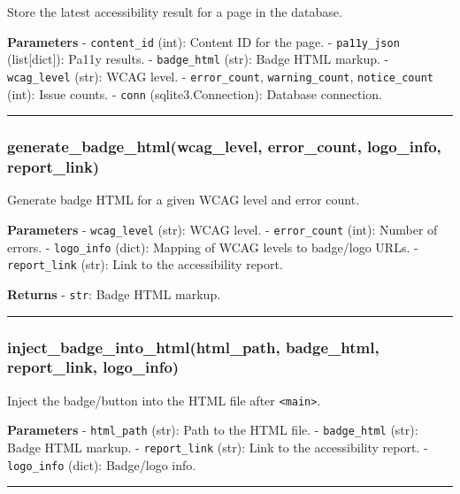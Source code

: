 Store the latest accessibility result for a page in the database.

\textbf{Parameters} - \texttt{content\_id} (int): Content ID for the
page. - \texttt{pa11y\_json} (list{[}dict{]}): Pa11y results. -
\texttt{badge\_html} (str): Badge HTML markup. - \texttt{wcag\_level}
(str): WCAG level. - \texttt{error\_count}, \texttt{warning\_count},
\texttt{notice\_count} (int): Issue counts. - \texttt{conn}
(sqlite3.Connection): Database connection.

\begin{center}\rule{0.5\linewidth}{0.5pt}\end{center}

\subsubsection{generate\_badge\_html(wcag\_level, error\_count,
logo\_info,
report\_link)}\label{generate_badge_htmlwcag_level-error_count-logo_info-report_link}

Generate badge HTML for a given WCAG level and error count.

\textbf{Parameters} - \texttt{wcag\_level} (str): WCAG level. -
\texttt{error\_count} (int): Number of errors. - \texttt{logo\_info}
(dict): Mapping of WCAG levels to badge/logo URLs. -
\texttt{report\_link} (str): Link to the accessibility report.

\textbf{Returns} - \texttt{str}: Badge HTML markup.

\begin{center}\rule{0.5\linewidth}{0.5pt}\end{center}

\subsubsection{inject\_badge\_into\_html(html\_path, badge\_html,
report\_link,
logo\_info)}\label{inject_badge_into_htmlhtml_path-badge_html-report_link-logo_info}

Inject the badge/button into the HTML file after
\texttt{\textless{}main\textgreater{}}.

\textbf{Parameters} - \texttt{html\_path} (str): Path to the HTML file.
- \texttt{badge\_html} (str): Badge HTML markup. - \texttt{report\_link}
(str): Link to the accessibility report. - \texttt{logo\_info} (dict):
Badge/logo info.

\begin{center}\rule{0.5\linewidth}{0.5pt}\end{center}

